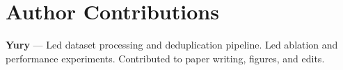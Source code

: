 \documentclass{article}
\begin{document}

\appendix

\section*{Author Contributions}
\textbf{Yury} — Led dataset processing and deduplication pipeline. Led ablation and performance experiments. Contributed to paper writing, figures, and edits.
\end{document}
